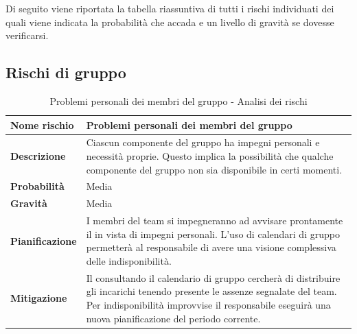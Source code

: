\documentclass[12pt,a4paper]{article}
\begin{document}
Di seguito viene riportata la tabella riassuntiva di tutti i rischi individuati dei quali viene indicata la probabilità che accada e un livello di gravità se dovesse verificarsi.

\subsection{Rischi di gruppo}

\begin{table}[H]
\begin{center}
\begin{tabular}{p{} p{}}
\toprule
\textbf{Nome rischio} & \textbf{Problemi personali dei membri del gruppo} \\
\midrule
\midrule
\textbf{Descrizione} & Ciascun componente del gruppo ha impegni personali e necessità proprie. Questo implica la possibilità che qualche componente del gruppo non sia disponibile in certi momenti. \\
\midrule
\textbf{Probabilità} & Media \\
\midrule
\textbf{Gravità} & Media \\
\midrule
\textbf{Pianificazione} & I membri del team si impegneranno ad avvisare prontamente il \PM{} in vista di impegni personali. L’uso di calendari di gruppo permetterà al responsabile di avere una visione complessiva delle indisponibilità.  \\
\midrule
\textbf{Mitigazione} & Il \PM{} consultando il calendario di gruppo cercherà di distribuire gli incarichi tenendo presente le assenze segnalate del team. Per indisponibilità improvvise il responsabile eseguirà una nuova pianificazione del periodo corrente. \\
\bottomrule
\end{tabular}
\caption{Problemi personali dei membri del gruppo - Analisi dei rischi}
\end{center}
\end{table}
\end{document}

